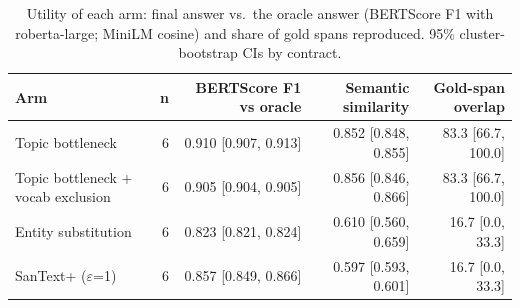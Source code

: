 \begin{table}[t]
\centering\small
\caption{Utility of each arm: final answer vs.\ the oracle answer (BERTScore F1 with roberta-large; MiniLM cosine) and share of gold spans reproduced. 95\% cluster-bootstrap CIs by contract.}
\label{tab:utility}
\begin{tabular}{lrrrr}
\toprule
Arm & n & BERTScore F1 vs oracle & Semantic similarity & Gold-span overlap \\
\midrule
Topic bottleneck & 6 & 0.910 [0.907, 0.913] & 0.852 [0.848, 0.855] & 83.3 [66.7, 100.0] \\
Topic bottleneck + vocab exclusion & 6 & 0.905 [0.904, 0.905] & 0.856 [0.846, 0.866] & 83.3 [66.7, 100.0] \\
Entity substitution & 6 & 0.823 [0.821, 0.824] & 0.610 [0.560, 0.659] & 16.7 [0.0, 33.3] \\
SanText+ ($\varepsilon$=1) & 6 & 0.857 [0.849, 0.866] & 0.597 [0.593, 0.601] & 16.7 [0.0, 33.3] \\
\bottomrule
\end{tabular}
\end{table}

